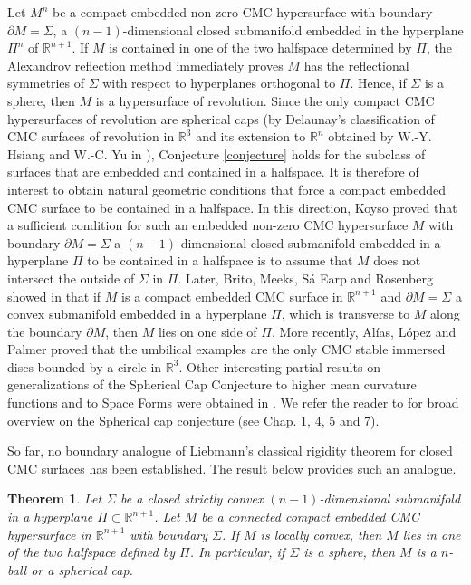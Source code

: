 \documentclass[11pt]{amsart}
\theoremstyle{plain}
\newtheorem{theorem}{Theorem}
\numberwithin{equation}{section}
\numberwithin{theorem}{section}
\begin{document}
Let $M^n$  be a compact embedded non-zero CMC hypersurface with boundary $\partial M=\Sigma$, a $(n-1)$-dimensional closed submanifold embedded in the hyperplane $\Pi^n$ of $\mathbb{R}^{n+1}$.  If $M$ is contained in one of the two halfspace determined by $\Pi$,  the Alexandrov reflection method  \cite{Ale56,Ale62} immediately proves $M$ has the reflectional symmetries of $\Sigma$ with respect to hyperplanes orthogonal to $\Pi$. Hence, if $\Sigma$ is a sphere, then $M$ is a hypersurface of revolution. Since the only compact CMC hypersurfaces of revolution are spherical caps (by Delaunay's classification of CMC surfaces of revolution in $\mathbb{R}^3$ and its extension to $\mathbb{R}^n$ obtained by W.-Y. Hsiang and W.-C. Yu in \cite{Hsiang}), Conjecture \ref{conjecture} holds for the subclass of surfaces that are embedded and contained in a halfspace. It is therefore of interest to obtain natural geometric conditions that force a compact embedded CMC  surface to be contained in a halfspace. In this direction, Koyso \cite{Koi86} proved that a sufficient condition for such an embedded non-zero CMC hypersurface $M$ with boundary $\partial M=\Sigma$ a $(n-1)$-dimensional closed submanifold embedded in a hyperplane $\Pi$ to be contained in a halfspace is to assume that $M$ does not intersect the outside of $\Sigma$ in $\Pi$. Later, Brito,  Meeks, S\'a Earp and Rosenberg showed in \cite{BEMR91} that if $M$ is a compact embedded CMC surface in $\mathbb{R}^{n+1}$ and $\partial M=\Sigma$  a convex submanifold embedded in a hyperplane $\Pi$, which is transverse to $M$ along the boundary $\partial M$, then $M$  lies on one side of $\Pi$. More recently, Al\'ias,  L\'opez and Palmer proved that the umbilical examples are the only CMC stable immersed discs bounded by a circle \cite{ALP99} in $\mathbb{R}^3$. Other interesting partial results on generalizations of  the Spherical Cap Conjecture to higher mean curvature functions and to Space Forms were obtained in \cite{AlDeMa06, Bar90, Bar91, BE91, Nelli}. We refer the reader to \cite{Lop1} for broad overview on the Spherical cap conjecture (see Chap. 1, 4, 5 and 7).

So far, no boundary analogue of Liebmann’s classical rigidity theorem for closed CMC surfaces has been established.
 The result below provides such an analogue.

\begin{theorem}
	\label{teorema}
	Let $\Sigma$ be a closed strictly convex  $(n-1)$-dimensional submanifold in a hyperplane $\Pi\subset \mathbb{R}^{n+1}$. Let $M$ be a connected compact embedded CMC hypersurface in $\mathbb{R}^{n+1}$ with boundary $\Sigma$. If $M$ is locally convex, then $M$ lies in one of the two halfspace defined by $\Pi$. In particular, if $\Sigma$ is a sphere, then $M$ is a $n$-ball or a spherical cap.
\end{theorem}
\end{document}
